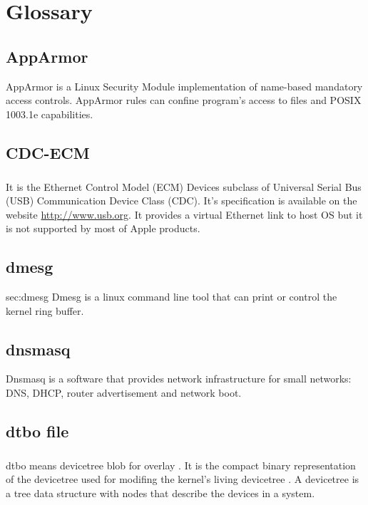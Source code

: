 \documentclass[mscthesis]{usiinfthesis}
\begin{document}
\backmatter

\chapter{Glossary} %
\section{AppArmor}\label{sec:AppArmor}
AppArmor is a Linux Security Module implementation of name-based mandatory access controls. AppArmor rules can confine program's access to files and POSIX 1003.1e capabilities.

\section{CDC-ECM}\label{sec:CDC-ECM}
\paragraph{}
It is the Ethernet Control Model (ECM) Devices subclass of Universal Serial Bus (USB) Communication Device Class (CDC). It's specification is available on the website \url{http://www.usb.org}. It provides a virtual Ethernet link to host OS but it is not supported by most of Apple products.

\section{dmesg}{sec:dmesg}
Dmesg is a linux command line tool that can print or control the kernel ring buffer.

\section{dnsmasq}\label{sec:dnsmasq}
Dnsmasq is a software that provides network infrastructure for small networks: DNS, DHCP, router advertisement and network boot.

\section{dtbo file}\label{sec:dtbo}
\paragraph{}
dtbo means devicetree blob for overlay \citep{dtbo:android}. It is the compact binary representation of the devicetree used for modifing the kernel's living devicetree \citep{dtbo:kernel}. A devicetree is a tree data structure with nodes that describe the devices in a system. \citep{dtbo:spec}
\end{document}

